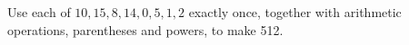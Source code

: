 Use each of $10,15,8,14,0,5,1,2$ exactly once, together with arithmetic operations, parentheses and powers, to make 512.
